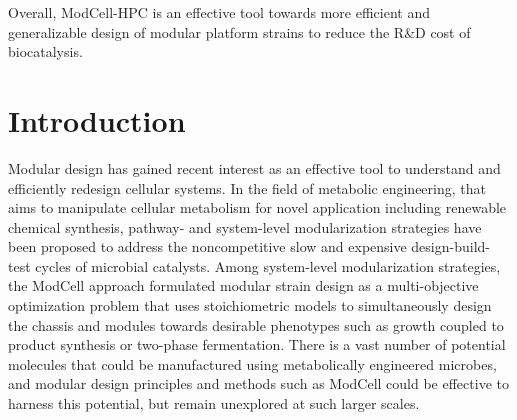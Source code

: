     Overall, ModCell-HPC is an effective tool towards more efficient and generalizable design of modular platform strains to reduce the R\&D cost of  biocatalysis.


\section{Introduction}

Modular design has gained recent interest as an effective tool to understand and efficiently redesign cellular systems. \citep{garcia2019b}
In the field of metabolic engineering, that aims to manipulate cellular metabolism for novel application including renewable chemical synthesis, pathway-\citep{biggs2014} and system-level\citep{trinh2015,garcia2019,garcia2019c,garcia2019d} modularization strategies have been proposed to address the noncompetitive slow and expensive design-build-test cycles of microbial catalysts.\citep{nielsen2016}
Among system-level modularization strategies, the ModCell approach formulated modular strain design as a multi-objective optimization problem that uses stoichiometric models to simultaneously design the chassis and modules towards desirable phenotypes such as growth coupled to product synthesis or two-phase fermentation.\citep{garcia2019}
There is a vast number of potential molecules that could be manufactured using metabolically engineered microbes,\citep{trinh2016} and modular design principles and methods such as ModCell could be effective to harness this potential, but remain unexplored at such larger scales. %

